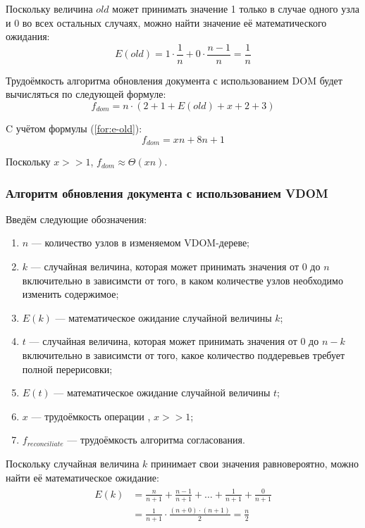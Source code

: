 Поскольку величина $old$ может принимать значение 1 только в случае одного узла и 0 во всех остальных случаях, можно найти значение её математического ожидания:
\begin{equation}
	\label{for:e-old}
	E(old) = 1 \cdot \frac{1}{n} + 0 \cdot \frac{n - 1}{n} = \frac{1}{n}
\end{equation}

Трудоёмкость алгоритма обновления документа с использованием DOM будет вычисляться по следующей формуле:
\begin{equation}
	\label{for:f-dom-1}
	f_{dom} = n \cdot (2 + 1 + E(old) + x + 2 + 3)
\end{equation}

C учётом формулы (\ref{for:e-old}):
\begin{equation}
	\label{for:f-dom-2}
	f_{dom} = xn + 8n + 1
\end{equation}

Поскольку $x >> 1$, $f_{dom} \approx \Theta(xn)$.

\subsubsection{Алгоритм обновления документа с использованием VDOM}
Введём следующие обозначения:
\begin{enumerate}[label=\arabic*)]
	\item $n$ --- количество узлов в изменяемом VDOM-дереве;
	\item $k$ --- случайная величина, которая может принимать значения от 0 до $n$ включительно в зависимсти от того, в каком количестве узлов необходимо изменить содержимое;
	\item $E(k)$ --- математическое ожидание случайной величины $k$;
	\item $t$ --- случайная величина, которая может принимать значения от 0 до $n - k$ включительно в зависимсти от того, какое количество поддеревьев требует полной перерисовки;
	\item $E(t)$ --- математическое ожидание случайной величины $t$;
	\item $x$ --- трудоёмкость операции , $x >> 1$;
	\item $f_{reconciliate}$ --- трудоёмкость алгоритма согласования.
\end{enumerate}

Поскольку случайная величина $k$ принимает свои значения равновероятно, можно найти её математическое ожидание:
\begin{align}
	\begin{split}
		\label{for:e-k}
		E(k) &= \frac{n}{n + 1} + \frac{n - 1}{n + 1}  + \dotsc + \frac{1}{n + 1} + \frac{0}{n + 1} \\
		&= \frac{1}{n + 1} \cdot \frac{(n + 0)\cdot(n + 1)}{2} = \frac{n}{2}
	\end{split}
\end{align}

